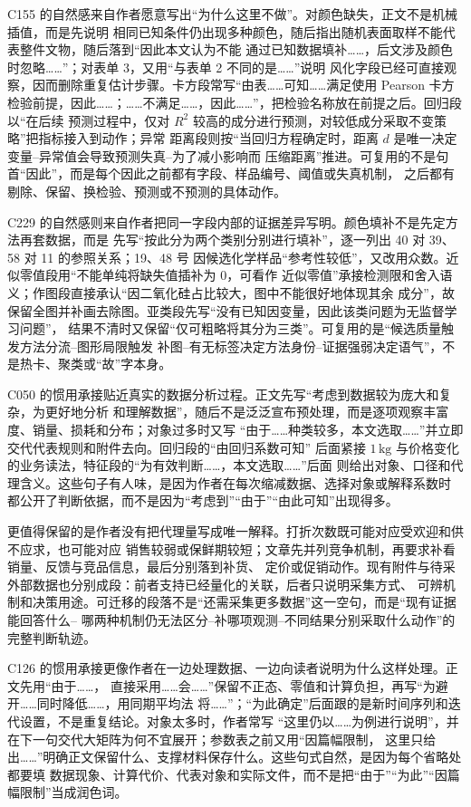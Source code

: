 \documentclass[UTF8,a4paper,12pt]{ctexart}
\begin{document}
C155 的自然感来自作者愿意写出“为什么这里不做”。对颜色缺失，正文不是机械插值，而是先说明
相同已知条件仍出现多种颜色，随后指出随机表面取样不能代表整件文物，随后落到“因此本文认为不能
通过已知数据填补……，后文涉及颜色时忽略……”；对表单 3，又用“与表单 2 不同的是……”说明
风化字段已经可直接观察，因而删除重复估计步骤。卡方段常写“由表……可知……满足使用 Pearson
卡方检验前提，因此……；……不满足……，因此……”，把检验名称放在前提之后。回归段以“在后续
预测过程中，仅对 $R^2$ 较高的成分进行预测，对较低成分采取不变策略”把指标接入到动作；异常
距离段则按“当回归方程确定时，距离 $d$ 是唯一决定变量--异常值会导致预测失真--为了减小影响而
压缩距离”推进。可复用的不是句首“因此”，而是每个因此之前都有字段、样品编号、阈值或失真机制，
之后都有剔除、保留、换检验、预测或不预测的具体动作。

C229 的自然感则来自作者把同一字段内部的证据差异写明。颜色填补不是先定方法再套数据，而是
先写“按此分为两个类别分别进行填补”，逐一列出 40 对 39、58 对 11 的参照关系；19、48 号
因候选化学样品“参考性较低”，又改用众数。近似零值段用“不能单纯将缺失值插补为 0，可看作
近似零值”承接检测限和舍入语义；作图段直接承认“因二氧化硅占比较大，图中不能很好地体现其余
成分”，故保留全图并补画去除图。亚类段先写“没有已知因变量，因此该类问题为无监督学习问题”，
结果不清时又保留“仅可粗略将其分为三类”。可复用的是“候选质量触发方法分流--图形局限触发
补图--有无标签决定方法身份--证据强弱决定语气”，不是热卡、聚类或“故”字本身。

C050 的惯用承接贴近真实的数据分析过程。正文先写“考虑到数据较为庞大和复杂，为更好地分析
和理解数据”，随后不是泛泛宣布预处理，而是逐项观察丰富度、销量、损耗和分布；对象过多时又写
“由于……种类较多，本文选取……”并立即交代代表规则和附件去向。回归段的“由回归系数可知”
后面紧接 $1\,\mathrm{kg}$ 与价格变化的业务读法，特征段的“为有效判断……，本文选取……”后面
则给出对象、口径和代理含义。这些句子有人味，是因为作者在每次缩减数据、选择对象或解释系数时
都公开了判断依据，而不是因为“考虑到”“由于”“由此可知”出现得多。

更值得保留的是作者没有把代理量写成唯一解释。打折次数既可能对应受欢迎和供不应求，也可能对应
销售较弱或保鲜期较短；文章先并列竞争机制，再要求补看销量、反馈与竞品信息，最后分别落到补货、
定价或促销动作。现有附件与待采外部数据也分别成段：前者支持已经量化的关联，后者只说明采集方式、
可辨机制和决策用途。可迁移的段落不是“还需采集更多数据”这一空句，而是“现有证据能回答什么--
哪两种机制仍无法区分--补哪项观测--不同结果分别采取什么动作”的完整判断轨迹。

C126 的惯用承接更像作者在一边处理数据、一边向读者说明为什么这样处理。正文先用“由于……，
直接采用……会……”保留不正态、零值和计算负担，再写“为避开……同时降低……，用同期平均法
将……”；“为此确定”后面跟的是新时间序列和迭代设置，不是重复结论。对象太多时，作者常写
“这里仍以……为例进行说明”，并在下一句交代大矩阵为何不宜展开；参数表之前又用“因篇幅限制，
这里只给出……”明确正文保留什么、支撑材料保存什么。这些句式自然，是因为每个省略处都要填
数据现象、计算代价、代表对象和实际文件，而不是把“由于”“为此”“因篇幅限制”当成润色词。
\end{document}
